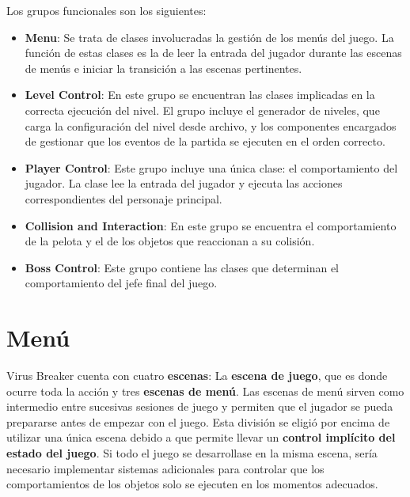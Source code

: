 Los grupos funcionales son los siguientes:
\begin{itemize}
\item \textbf{Menu}: Se trata de clases involucradas la gestión de los menús del juego. La función de estas clases es la de leer la entrada del jugador durante las escenas de menús e iniciar la transición a las escenas pertinentes.
\item \textbf{Level Control}: En este grupo se encuentran las clases implicadas en la correcta ejecución del nivel. El grupo incluye el generador de niveles, que carga la configuración del nivel desde archivo, y los componentes encargados de gestionar que los eventos de la partida se ejecuten en el orden correcto.
\item \textbf{Player Control}: Este grupo incluye una única clase: el comportamiento del jugador. La clase lee la entrada del jugador y ejecuta las acciones correspondientes del personaje principal.
\item \textbf{Collision and Interaction}: En este grupo se encuentra el comportamiento de la pelota y el de los objetos que reaccionan a su colisión.
\item \textbf{Boss Control}: Este grupo contiene las clases que determinan el comportamiento del jefe final del juego.
\end{itemize}

\section{Menú}
Virus Breaker cuenta con cuatro \textbf{escenas}: La \textbf{escena de juego}, que es donde ocurre toda la acción y tres \textbf{escenas de menú}. Las escenas de menú sirven como intermedio entre sucesivas sesiones de juego y permiten que el jugador se pueda prepararse antes de empezar con el juego. Esta división se eligió por encima de utilizar una única escena debido a que permite llevar un \textbf{control implícito del estado del juego}. Si todo el juego se desarrollase en la misma escena, sería necesario implementar sistemas adicionales para controlar que los comportamientos de los objetos solo se ejecuten en los momentos adecuados.

